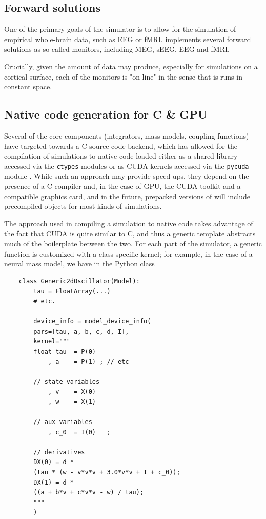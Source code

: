 
\subsection{Forward solutions}

	One of the primary goals of the \TVB simulator is to allow for the
	simulation of empirical whole-brain data, such as EEG or fMRI.
	\TVB implements several forward solutions as so-called monitors, 
	including MEG, sEEG, EEG and fMRI. 

	Crucially, given the amount of data \TVB may produce, especially for
	simulations on a cortical surface, each of the monitors is "on-line"
	in the sense that is runs in constant space.

\subsection{Native code generation for C \& GPU}

	Several of the core components (integrators, mass models, coupling
	functions) have targeted towards a C source code backend, which has
	allowed for the compilation of simulations to native code loaded 
	either as a shared library accessed via the \texttt{ctypes} modules
	or as CUDA kernels accessed via the \texttt{pycuda} module \cite{pycuda}.
	While such an approach may provide speed ups, they depend on the
	presence of a C compiler and, in the case of GPU, the CUDA toolkit and
	a compatible graphics card, and in the future, prepacked versions of \TVB
	will include precompiled objects for most kinds of simulations. 

	The approach used in compiling a simulation to native code takes advantage
	of the fact that CUDA is quite similar to C, and thus a generic template
	abstracts much of the boilerplate between the two. For each part of the 
	simulator, a generic function is customized with a class specific kernel;
	for example, in the case of a neural mass model, we have in the Python class

	\begin{lstlisting}
	class Generic2dOscillator(Model):
	    tau = FloatArray(...)
	    # etc.

	    device_info = model_device_info(
		pars=[tau, a, b, c, d, I],
		kernel="""
		float tau  = P(0)
		    , a    = P(1) ; // etc

		// state variables
		    , v    = X(0)
		    , w    = X(1)

		// aux variables
		    , c_0  = I(0)   ;

		// derivatives
		DX(0) = d * 
		(tau * (w - v*v*v + 3.0*v*v + I + c_0));
		DX(1) = d * 
		((a + b*v + c*v*v - w) / tau);
		"""
	    )
	\end{lstlisting}

